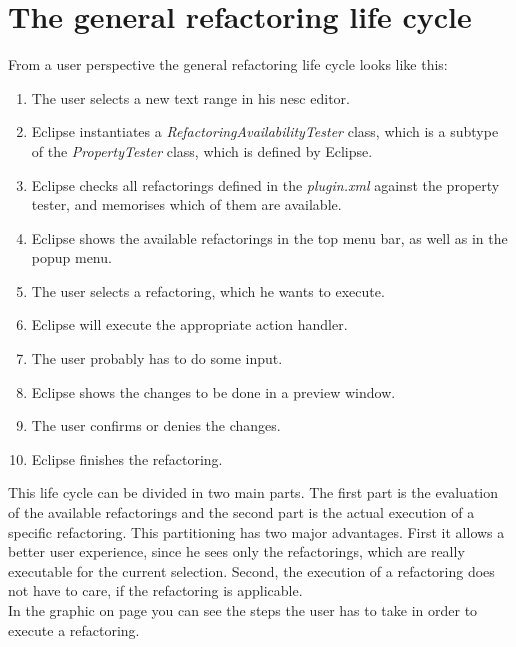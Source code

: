 \documentclass[a4paper,10pt]{report}
\begin{document}
\section{The general refactoring life cycle}
From a user perspective the general refactoring life cycle looks like this:
   \begin{enumerate}
     \item The user selects a new text range in his nesc editor.
     \item Eclipse instantiates a {\it RefactoringAvailabilityTester} class, which is a subtype of the {\it PropertyTester} class, which is defined by Eclipse.
     \item Eclipse checks all refactorings defined in the {\it plugin.xml} against the property tester, and memorises which of them are available. 
     \item Eclipse shows the available refactorings in the top menu bar, as well as in the popup menu.
     \item The user selects a refactoring, which he wants to execute.
     \item Eclipse will execute the appropriate action handler.
     \item The user probably has to do some input.
     \item Eclipse shows the changes to be done in a preview window.
     \item The user confirms or denies the changes.
     \item Eclipse finishes the refactoring.
   \end{enumerate}
This life cycle can be divided in two main parts. The first part is the evaluation of the available refactorings and the second part is the actual execution of a specific refactoring. 
This partitioning has two major advantages. First it allows a better user experience, since he sees only the refactorings, which are really executable for the current selection. 
Second, the execution of a refactoring does not have to care, if the refactoring is applicable.\\
In the graphic on page \pageref{UserInputSequence} you can see the steps the user has to take in order to execute a refactoring.
\end{document}
